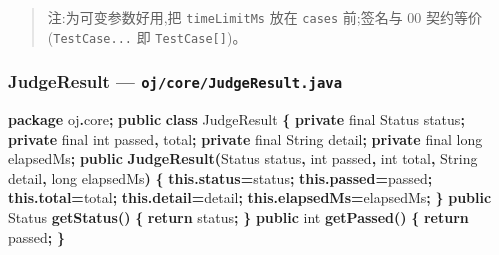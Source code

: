 \documentclass[
  11pt,
]{ctexart}
\newenvironment{Shaded}{\begin{snugshade}}{\end{snugshade}}
\newcommand{\BuiltInTok}[1]{#1}
\newcommand{\ControlFlowTok}[1]{\textcolor[rgb]{0.13,0.29,0.53}{\textbf{#1}}}
\newcommand{\DataTypeTok}[1]{\textcolor[rgb]{0.13,0.29,0.53}{#1}}
\newcommand{\FunctionTok}[1]{\textcolor[rgb]{0.13,0.29,0.53}{\textbf{#1}}}
\newcommand{\ImportTok}[1]{#1}
\newcommand{\KeywordTok}[1]{\textcolor[rgb]{0.13,0.29,0.53}{\textbf{#1}}}
\newcommand{\NormalTok}[1]{#1}
\newcommand{\OperatorTok}[1]{\textcolor[rgb]{0.81,0.36,0.00}{\textbf{#1}}}
\begin{document}
\begin{quote}
注:为可变参数好用,把 \texttt{timeLimitMs} 放在 \texttt{cases} 前;签名与
00 契约等价(\texttt{TestCase...} 即 \texttt{TestCase{[}{]}})。
\end{quote}

\hypertarget{judgeresult-ojcorejudgeresult.java}{%
\subsubsection{\texorpdfstring{JudgeResult ---
\texttt{oj/core/JudgeResult.java}}{JudgeResult --- oj/core/JudgeResult.java}}\label{judgeresult-ojcorejudgeresult.java}}

\begin{Shaded}
\begin{Highlighting}[]
\KeywordTok{package}\ImportTok{ oj}\OperatorTok{.}\ImportTok{core}\OperatorTok{;}
\KeywordTok{public} \KeywordTok{class}\NormalTok{ JudgeResult }\OperatorTok{\{}
    \KeywordTok{private} \DataTypeTok{final}\NormalTok{ Status status}\OperatorTok{;}
    \KeywordTok{private} \DataTypeTok{final} \DataTypeTok{int}\NormalTok{ passed}\OperatorTok{,}\NormalTok{ total}\OperatorTok{;}
    \KeywordTok{private} \DataTypeTok{final} \BuiltInTok{String}\NormalTok{ detail}\OperatorTok{;}
    \KeywordTok{private} \DataTypeTok{final} \DataTypeTok{long}\NormalTok{ elapsedMs}\OperatorTok{;}
    \KeywordTok{public} \FunctionTok{JudgeResult}\OperatorTok{(}\NormalTok{Status status}\OperatorTok{,} \DataTypeTok{int}\NormalTok{ passed}\OperatorTok{,} \DataTypeTok{int}\NormalTok{ total}\OperatorTok{,} \BuiltInTok{String}\NormalTok{ detail}\OperatorTok{,} \DataTypeTok{long}\NormalTok{ elapsedMs}\OperatorTok{)} \OperatorTok{\{}
        \KeywordTok{this}\OperatorTok{.}\FunctionTok{status}\OperatorTok{=}\NormalTok{status}\OperatorTok{;} \KeywordTok{this}\OperatorTok{.}\FunctionTok{passed}\OperatorTok{=}\NormalTok{passed}\OperatorTok{;} \KeywordTok{this}\OperatorTok{.}\FunctionTok{total}\OperatorTok{=}\NormalTok{total}\OperatorTok{;}
        \KeywordTok{this}\OperatorTok{.}\FunctionTok{detail}\OperatorTok{=}\NormalTok{detail}\OperatorTok{;} \KeywordTok{this}\OperatorTok{.}\FunctionTok{elapsedMs}\OperatorTok{=}\NormalTok{elapsedMs}\OperatorTok{;}
    \OperatorTok{\}}
    \KeywordTok{public}\NormalTok{ Status }\FunctionTok{getStatus}\OperatorTok{()}  \OperatorTok{\{} \ControlFlowTok{return}\NormalTok{ status}\OperatorTok{;} \OperatorTok{\}}
    \KeywordTok{public} \DataTypeTok{int} \FunctionTok{getPassed}\OperatorTok{()}     \OperatorTok{\{} \ControlFlowTok{return}\NormalTok{ passed}\OperatorTok{;} \OperatorTok{\}}

\end{Highlighting}
\end{Shaded}
\end{document}
